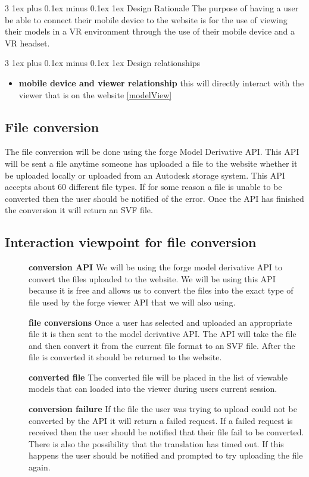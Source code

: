 \documentclass[letterpaper, 10pt, draftclsnofoot, compsoc, onecolumn]{IEEEtran}
\makeatletter
\def\subsubsection{\@startsection{subsubsection}%
                                 {3}%
                                 {\z@}%
                                 {1ex plus 0.1ex minus 0.1ex}%
                                 {1ex}%
                                 {\normalfont\normalsize}}%
\makeatother
\begin{document}
\subsubsection{Design Rationale}
	The purpose of having a user be able to connect their mobile device to the website is for the use of viewing their models in a VR environment through the use of their mobile device and a VR headset. 

\subsubsection{Design relationships}
\begin{itemize}
	\item[]\textbf{mobile device and viewer relationship} this will directly interact with the viewer that is on the website \ref{modelView}
\end{itemize}

\subsection{File conversion}
\label{model derivative} 
	The file conversion will be done using the forge Model Derivative API. This API will be sent a file anytime someone has uploaded a file to the website whether it be uploaded locally or uploaded from an Autodesk storage system. This API accepts about 60 different file types. If for some reason a file is unable to be converted then the user should be notified of the error. Once the API has finished the conversion it will return an SVF file. 

\subsection{Interaction viewpoint for file conversion}
\begin{description}
	\item[]\textbf{conversion API} We will be using the forge model derivative API to convert the files uploaded to the website. We will be using this API because it is free and allows us to convert the files into the exact type of file used by the forge viewer API that we will also using. 
	\item[]\textbf{file conversions} Once a user has selected and uploaded an appropriate file it is then sent to the model derivative API. The API will take the file and then convert it from the current file format to an SVF file. After the file is converted it should be returned to the website.
	\item[]\textbf{converted file} The converted file will be placed in the list of viewable models that can loaded into the viewer during users current session.
	\item[]\textbf{conversion failure} If the file the user was trying to upload could not be converted by the API it will return a failed request. If a failed request is received then the user should be notified that their file fail to be converted. There is also the possibility that the translation has timed out. If this happens the user should be notified and prompted to try uploading the file again.
\end{description}
\end{document}
